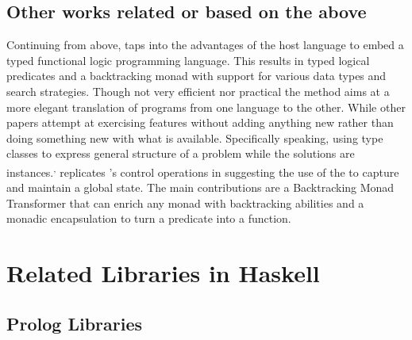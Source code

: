 \documentclass[thesis-solanki.tex]{subfiles}
\begin{document}
\subsection{Other works related or based on the above}


Continuing from above, \cite{claessen2000typed} taps into the advantages of the host language to embed a typed
functional logic programming language.
This results in typed logical predicates and a backtracking monad with support for various data types and search
strategies.
Though not very efficient nor practical the method aims at a more elegant translation of programs from one language
to the other.
While other papers \cite{erwig2004escape} attempt at exercising  features without adding
anything new rather than doing something new with what is available.
Specifically speaking, using  type classes to express general structure of a problem while the
solutions are instances.\textsuperscript{,}
\cite{hinze1998prological} replicates 's control operations in  suggesting the
use of the   to capture and maintain a global state.
The main contributions are a Backtracking Monad Transformer that can enrich any monad with backtracking abilities
and a monadic encapsulation to turn a  predicate into a  function.



\section{Related Libraries in Haskell}
\subsection{Prolog Libraries}
\end{document}
